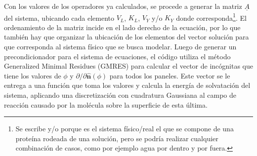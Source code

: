 \documentclass[12pt, twoside, onehalfspace, numbers, spanish]{ezthesis}
\numberwithin{equation}{section}
\begin{document}
Con los valores de los operadores ya calculados, se procede a generar la matriz $\underline{A}$ del sistema, ubicando cada elemento $V_L$, $K_L$, $V_Y$ y/o $K_Y$ donde corresponda\footnote{Se escribe y/o porque es el sistema físico/real el que se compone de una proteína rodeada de una solución, pero se podría realizar cualquier combinación de casos, como por ejemplo agua por dentro y por fuera.}. El ordenamiento de la matriz incide en el lado derecho de la ecuación, por lo que también hay que organizar la ubicación de los elementos del vector solución para que corresponda al sistema físico que se busca modelar. Luego de generar un precondicionador para el sistema de ecuaciones, el código utiliza el método Generalized Minimal Residues (GMRES) para calcular el vector de incógnitas que tiene los valores de $\phi$ y $\partial/\partial\hat{\mathbf{n}}(\phi)$ para todos los paneles. Este vector se le entrega a una función que toma los valores y calcula la energía de solvatación del sistema, aplicando una discretización con cuadratura Gaussiana al campo de reacción causado por la molécula sobre la superficie de esta última. 

\end{document}
